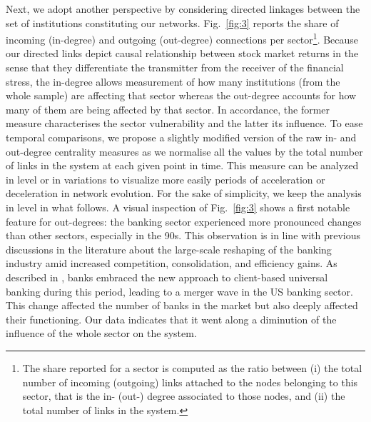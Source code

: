 \documentclass[a4paper,10pt]{article}
\begin{document}
\noindent Next, we adopt another perspective by considering directed linkages between the set of institutions constituting our networks. Fig.~\ref{fig:3} reports
the share of incoming (in-degree) and outgoing (out-degree) connections per sector\footnote{The share reported for a sector is computed as the ratio 
between (i) the total number of incoming (outgoing) links attached to the nodes belonging to this sector, that is the in- (out-) degree associated to those
nodes, and (ii) the total number of links in the system.}. Because our directed links depict causal relationship between stock 
market returns in the sense that they differentiate the transmitter from the receiver of the financial stress, the in-degree 
allows measurement of how many institutions (from the whole sample) are affecting that sector whereas the out-degree accounts 
for how many of them are being affected by that sector. In accordance, the former measure characterises the sector 
vulnerability and the latter its influence. To ease temporal comparisons, we propose a slightly modified version of the raw in- and out-degree centrality 
measures as we normalise all the values by the total number of links in the system at each given point in time. This measure 
can be analyzed in level or in
variations to visualize more easily periods of acceleration or deceleration in network evolution. For the sake of simplicity, we keep the analysis in
level in what follows.  A visual inspection of Fig.~\ref{fig:3} shows a first notable feature for out-degrees: the banking sector experienced more pronounced changes
than other sectors, especially in the 90s. This observation is in line 
with previous discussions in the literature about the large-scale reshaping of the banking industry amid increased competition,
consolidation, and efficiency gains. As described in \cite{Calomiris}, banks embraced the new approach to client-based 
universal banking during this period, leading to a merger wave in the US banking sector. This change affected the number of 
banks in the market but also deeply affected their functioning. Our data indicates that it went along a diminution of the 
influence of the whole sector on the system.
\end{document}
